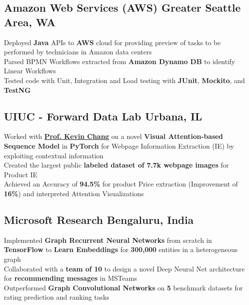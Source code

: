 \documentclass[]{Keval-resume}
\begin{document}
\subsection{Amazon Web Services (AWS) \hfill \normalfont G\lowercase{reater} S\lowercase{eattle} A\lowercase{rea}, WA}
\textbullet{} Deployed \textbf{Java} APIs to \textbf{AWS} cloud for providing preview of tasks to be performed by technicians in Amazon data centers \\
\textbullet{} Parsed BPMN Workflows extracted from \textbf{Amazon Dynamo DB} to identify Linear Workflows \\
\textbullet{} Tested code with Unit, Integration and Load testing with \textbf{JUnit}, \textbf{Mockito}, and \textbf{TestNG}
\sectionsep

\subsection{UIUC - Forward Data Lab \hfill \normalfont U\lowercase{rbana}, IL}
\textbullet{} Worked with \href{http://www.forwarddatalab.org/kevinccchang}{\textbf{Prof. Kevin Chang}} on a  novel \textbf{Visual Attention-based Sequence Model} in \textbf{PyTorch} for Webpage Information Extraction (IE) by exploiting contextual information \\
\textbullet{} Created the largest public \textbf{labeled dataset of 7.7k webpage images} for Product IE \\
\textbullet{} Achieved an Accuracy of \textbf{94.5\%} for product Price extraction (Improvement of \textbf{16\%}) and interpreted Attention Visualizations
\sectionsep

\subsection{Microsoft Research \hfill \normalfont B\lowercase{engaluru}, I\lowercase{ndia}}
\textbullet{} Implemented \textbf{Graph Recurrent Neural Networks} from scratch in \textbf{TensorFlow} to \textbf{Learn Embeddings} for \textbf{300,000} entities in a heterogeneous graph \\
\textbullet{} Collaborated with a \textbf{team of 10} to design a novel Deep Neural Net architecture for \textbf{recommending messages} in MSTeams \\
\textbullet{} Outperformed \textbf{Graph Convolutional Networks} on \textbf{5} benchmark datasets for rating prediction and ranking tasks
\sectionsep
\end{document}
